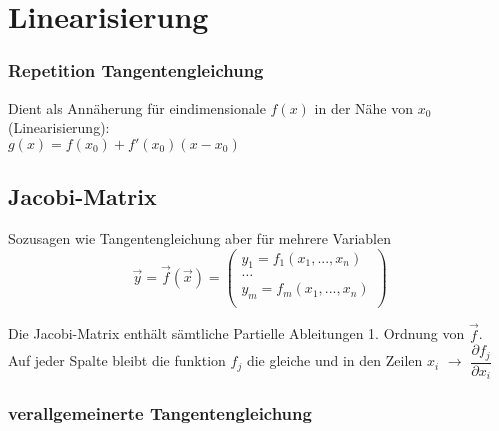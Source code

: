 \section{Linearisierung}

\subsubsection{Repetition Tangentengleichung}

Dient als Annäherung für eindimensionale $f(x)$ in der Nähe von $x_0$ (Linearisierung): \\
$g(x) = f(x_0) + f'(x_0)(x - x_0)$




\subsection{Jacobi-Matrix}
Sozusagen wie Tangentengleichung aber für mehrere Variablen
$$\vec{y} = \vec{f}(\vec{x}) =
	\begin{pmatrix}
		y_1 = f_1(x_1, ..., x_n) \\
		\hdots                   \\
		y_m = f_m(x_1, ..., x_n) \\
	\end{pmatrix}
$$

Die Jacobi-Matrix enthält sämtliche Partielle Ableitungen 1. Ordnung von $\vec{f}$. \\
Auf jeder Spalte bleibt die funktion $f_j$ die gleiche und in den
Zeilen $x_i$ $\rightarrow$ $\dfrac{\partial f_j}{\partial x_i}$

\begingroup
\renewcommand*{\arraystretch}{1.8}
\endgroup

\subsubsection{verallgemeinerte Tangentengleichung}

